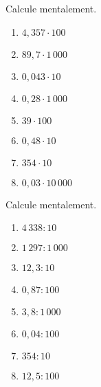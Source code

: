 \begin{exercice}
Calcule mentalement.
\begin{enumerate} 
 \item $4,357 \cdot 100$ \dotfill \hspace*{12em}
 
 \item $89,7 \cdot 1\,000$ \dotfill \hspace*{12em}
 
 \item $0,043 \cdot 10$ \dotfill \hspace*{12em}
 
 \item $0,28 \cdot 1\,000$ \dotfill \hspace*{12em}
 
 \item $39 \cdot 100$ \dotfill \hspace*{12em}
 
 \item $0,48 \cdot 10$ \dotfill \hspace*{12em}
 	
 \item $354 \cdot 10$ \dotfill \hspace*{12em}
 	
 \item $0,03 \cdot 10\,000$ \dotfill \hspace*{12em}
 
 \end{enumerate}
\end{exercice}


\begin{exercice}
Calcule mentalement.
\begin{enumerate} 
 \item $4\,338 : 10$ \dotfill \hspace*{12em}
 
 \item $1\,297 : 1\,000$ \dotfill \hspace*{12em}
 	
 \item $12,3 : 10$ \dotfill \hspace*{12em}
 
 \item $0,87 : 100$ \dotfill \hspace*{12em}
 	
 \item $3,8 : 1\,000$ \dotfill \hspace*{12em}
 
 \item $0,04 : 100$ \dotfill \hspace*{12em}
 	
 \item $354 : 10$ \dotfill \hspace*{12em}
 
 \item $12,5 : 100$ \dotfill \hspace*{12em}
 
 \end{enumerate}
\end{exercice}


